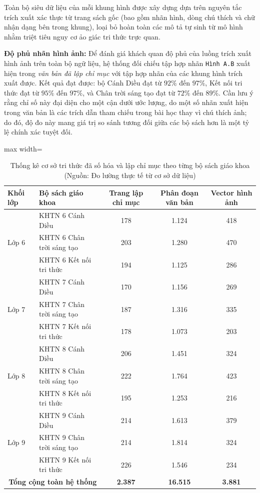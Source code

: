 Toàn bộ siêu dữ liệu của mỗi khung hình được xây dựng dựa trên nguyên tắc trích xuất xác thực từ trang sách gốc (bao gồm nhãn hình, dòng chú thích và chữ nhận dạng bên trong khung), loại bỏ hoàn toàn các mô tả tự sinh từ mô hình nhằm triệt tiêu nguy cơ ảo giác tri thức trực quan.

\textbf{Độ phủ nhãn hình ảnh:} Để đánh giá khách quan độ phủ của luồng trích xuất hình ảnh trên toàn bộ ngữ liệu, hệ thống đối chiếu tập hợp nhãn \texttt{Hình A.B} xuất hiện trong \textit{văn bản đã lập chỉ mục} với tập hợp nhãn của các khung hình trích xuất được. Kết quả đạt được: bộ Cánh Diều đạt từ $92\%$ đến $97\%$, Kết nối tri thức đạt từ $95\%$ đến $97\%$, và Chân trời sáng tạo đạt từ $72\%$ đến $89\%$. Cần lưu ý rằng chỉ số này đại diện cho một cận dưới ước lượng, do một số nhãn xuất hiện trong văn bản là các trích dẫn tham chiếu trong bài học thay vì chú thích ảnh; do đó, độ đo này mang giá trị so sánh tương đối giữa các bộ sách hơn là một tỷ lệ chính xác tuyệt đối.

\begin{table}[H]
\centering
\caption{Thống kê cơ sở tri thức đã số hóa và lập chỉ mục theo từng bộ sách giáo khoa (Nguồn: Đo lường thực tế từ cơ sở dữ liệu)}
\label{tab:corpus}
\small
\begin{adjustbox}{max width=\textwidth}
\begin{tabular}{llccc}
\toprule
\textbf{Khối lớp} & \textbf{Bộ sách giáo khoa} & \textbf{Trang lập chỉ mục} & \textbf{Phân đoạn văn bản} & \textbf{Vector hình ảnh} \\
\midrule
\multirow{3}{*}{Lớp 6}
 & KHTN 6 Cánh Diều            & 178 & 1.124 & 418 \\
 & KHTN 6 Chân trời sáng tạo   & 203 & 1.280 & 470 \\
 & KHTN 6 Kết nối tri thức     & 194 & 1.125 & 286 \\
\midrule
\multirow{3}{*}{Lớp 7}
 & KHTN 7 Cánh Diều            & 170 & 1.156 & 269 \\
 & KHTN 7 Chân trời sáng tạo   & 187 & 1.316 & 335 \\
 & KHTN 7 Kết nối tri thức     & 178 & 1.073 & 203 \\
\midrule
\multirow{3}{*}{Lớp 8}
 & KHTN 8 Cánh Diều            & 206 & 1.451 & 324 \\
 & KHTN 8 Chân trời sáng tạo   & 222 & 1.764 & 423 \\
 & KHTN 8 Kết nối tri thức     & 195 & 1.253 & 216 \\
\midrule
\multirow{3}{*}{Lớp 9}
 & KHTN 9 Cánh Diều            & 214 & 1.613 & 379 \\
 & KHTN 9 Chân trời sáng tạo   & 214 & 1.814 & 324 \\
 & KHTN 9 Kết nối tri thức     & 226 & 1.546 & 234 \\
\midrule
\multicolumn{2}{r}{\textbf{Tổng cộng toàn hệ thống}} & \textbf{2.387} & \textbf{16.515} & \textbf{3.881} \\
\bottomrule
\end{tabular}
\end{adjustbox}
\end{table}

